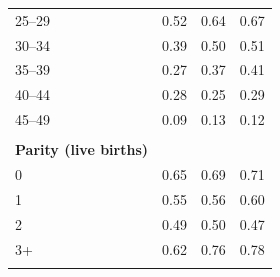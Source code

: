 \begin{tabular}{lccc}
\hspace*{2em}25--29&0.52&0.64&0.67\\
\hspace*{2em}30--34&0.39&0.50&0.51\\
\hspace*{2em}35--39&0.27&0.37&0.41\\
\hspace*{2em}40--44&0.28&0.25&0.29\\
\hspace*{2em}45--49&0.09&0.13&0.12\\
&&&\\
\textbf{Parity (live births)}&&&\\
\hspace*{2em}0&0.65&0.69&0.71\\
\hspace*{2em}1&0.55&0.56&0.60\\
\hspace*{2em}2&0.49&0.50&0.47\\
\hspace*{2em}3+&0.62&0.76&0.78\\
&&&\\
\bottomrule
\end{tabular}
